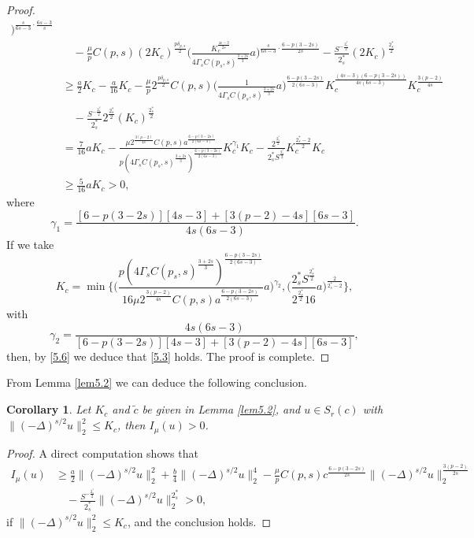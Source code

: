 \documentclass[11pt]{article}
\numberwithin{equation}{section}
\newtheorem{corollary}[theorem]{Corollary}
\begin{document}
\begin{proof}
\begin{equation}
\begin{split}
   \Big)^{{\frac{s}{6s-3}}\cdot\frac{6s-3}{s}}\\
&\quad -\frac{\mu}{p}C(p,s)(2K_c)^{\frac{p {\delta_{p,s}}}{2}} 
 \Big(\frac{K_c^{\frac{4s-3}{2s}}}{4\Gamma_s C(p_s, s)^{\frac{3+2s}{3}}}a
 \Big)^{\frac{s}{6s-3}\cdot{\frac{6-p(3-2s)}{2s}}}
 -\frac{S^{-\frac{2^*_s}{2}}}{2^*_s}(2K_c)^{\frac{2^*_s}{2}}\\
&\geq  \frac{a}{2}K_c-\frac{a}{16}K_c-\frac{\mu}{p}2^{\frac{p {\delta_{p,s}}}{2}}
 C(p,s)\Big(\frac{1}{4\Gamma_s C(p_s, s)^{\frac{3+2s}{3}}}a
 \Big)^{{\frac{6-p(3-2s)}{2(6s-3)}}}K^{\frac{(4s-3)(6-p(3-2s))}{4s(6s-3)}}_c 
  K^{\frac{3(p-2)}{4s}}_c\\
&\quad -\frac{S^{-\frac{2^*_s}{2}}}{2^*_s}2^{\frac{2^*_s}{2}}(K_c)^{\frac{2^*_s}{2}}\\
&= \frac{7}{16}aK_c-\frac{\mu 2^{\frac{3(p-2)}{4s}}C(p,s)a^{{\frac{6-p(3-2s)}{2(6s-3)}}}}{p(4\Gamma_s C(p_s, s)^{\frac{3+2s}{3}})^{\frac{6-p(3-2s)}{2(6s-3)}}}K^{\gamma_1}_c K_c-\frac{2^{\frac{2^*_s}{2}}}{2^*_sS^{\frac{2^*_s}{2}}}K^{\frac{2^*_s-2}{2}}_c K_c\\
&\geq   \frac{5}{16}aK_c>0,
\end{split}
\end{equation}
where 
\[
\gamma_1=\frac{[6-p(3-2s)][4s-3]+[3(p-2)-4s][6s-3]}{4s(6s-3)}.
\] 
If we take
$$
K_c=\min\Big\{ \Big(\frac{{p(4\Gamma_s C(p_s, s)^{\frac{3+2s}{3}}) }
 ^{\frac{6-p(3-2s)}{2(6s-3)}}}{16 \mu 2^{\frac{3(p-2)}{4s}}C(p,s)
 a^\frac{6-p(3-2s)}{2(6s-3)}} a\Big)^{\gamma_2}, 
 \Big(\frac{2^*_s S^{\frac{2^*_s}{2}}}{2^{\frac{2^*_s}{2}}16} a
  \Big)^{\frac{2}{2^*_s-2}}\Big\},
$$
with 
\[
\gamma_2=\frac{4s(6s-3)}{[6-p(3-2s)][4s-3]+[3(p-2)-4s][6s-3]},
\]
then, by \eqref{5.6} we deduce that \eqref{5.3} holds. The proof is complete.
\end{proof}

From Lemma \ref{lem5.2}  we can deduce the following conclusion.

\begin{corollary}\label{cor5.1}  
Let $K_c$ and $\tilde{c}$ be given in Lemma \ref{lem5.2}, and $u\in  S_{r}(c)$ with 
$\|(-\Delta)^{s/2}u\|^2_2 \leq K_c$, then $I_\mu(u)>0$.
\end{corollary}

\begin{proof}
A direct computation shows that
\begin{align*} %
I_\mu(u)
&\geq  \frac{a}{2}\|(-\Delta)^{s/2}u\|^2_2+\frac{b}{4}\|(-\Delta)^{s/2}u\|^4_2
 -\frac{\mu}{p}C(p,s)
c^{\frac{6-p(3-2s)}{2s}}\|(-\Delta)^{s/2}u\|^{\frac{3(p-2)}{2s}}_2\\
&\quad -\frac{S^{-\frac{2^*_s}{2}}}{2^*_s}\|(-\Delta)^{s/2}u\|^{2^*_s}_2>0,
\end{align*}
if $\|(-\Delta)^{s/2}u\|^2_2 \leq K_c$, and the conclusion holds.
\end{proof}
\end{document}
